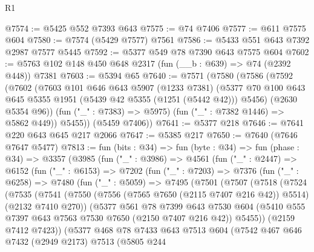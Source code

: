 \begin{lexlean}{R1}
\begin{coremodule}
@7574 := @5425 @552 @7393 @643
@7575 := @74 @7406
@7577 := @611 @7575 @604
@7580 := @7574 (@5429 @7577) @7561
@7586 := @5433 @551 @643 @7392 @2987 @7577 @5445
@7592 := @5377 @549 @78 @7390 @643 @7575 @604
@7602 := @5763 @102 @148 @450 @648 @2317 (fun (__b : @639) => @74 (@2392 @448)) @7381
@7603 := @5394 @65
@7640 := @7571
    (@7580
      (@7586
        (@7592
          (@7602
            (@7603
              @101
              @646
              @643
              @5907
              (@1233 @7381)
              (@5377 @70 @100 @643 @645 @5355 @1951 (@5439 @42 @5355 (@1251 (@5442 @42))) @5456)
              (@2630 @5354 @96))
            (fun ("_" : @7383) => @5975)
            (fun ("_" : @7382 @1446) => @5862 @449))
          @5455))
      (@5459 @7406))
@7641 := @5377 @218
@7646 := @7641 @220 @643 @645 @217 @2066
@7647 := @5385 @217
@7650 := @7640 (@7646 @7647 @5477)
@7813 := fun (bits : @34) =>
  fun (byte : @34) =>
  fun (phase : @34) =>
  @3357
    (@3985
      (fun ("_" : @3986) =>
      @4561
        (fun ("_" : @2447) =>
        @6152
          (fun ("_" : @6153) =>
          @7202
            (fun ("_" : @7203) =>
            @7376
              (fun ("_" : @6258) =>
              @7480
                (fun ("_" : @5059) =>
                @7495
                  (@7501
                    (@7507
                      (@7518
                        (@7524
                          (@7535
                            (@7541
                              (@7550
                                (@7556 (@7565 @7650 (@2115 @7407 @216 @42)) @5514)
                                (@2132 @7410 @270))
                              (@5377
                                @561
                                @78
                                @7399
                                @643
                                @7530
                                @604
                                (@5410 @555 @7397 @643 @7563 @7530 @7650 (@2150 @7407 @216 @42))
                                @5455))
                            (@2159 @7412 @7423))
                          (@5377
                            @468
                            @78
                            @7433
                            @643
                            @7513
                            @604
                            (@7542
                              @467
                              @646
                              @7432
                              (@2949 @2173)
                              @7513
                              (@5805
                                @244

\end{coremodule}
\end{lexlean}
